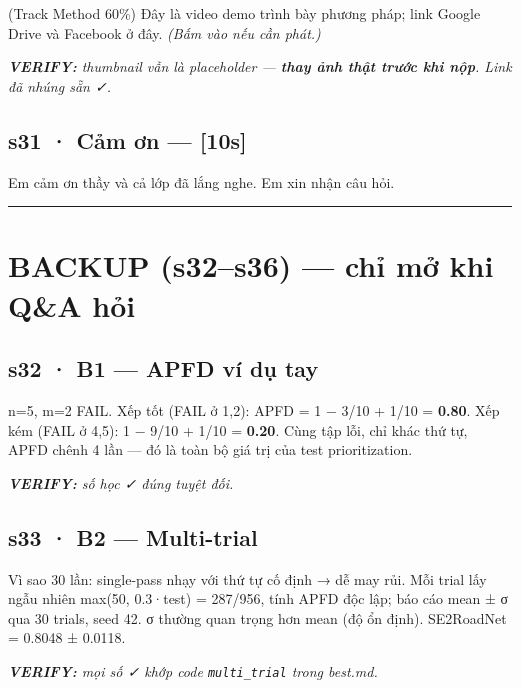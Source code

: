 \documentclass[
  11pt,
]{article}
\renewenvironment{quote}
  {\par\smallskip\noindent
   \def\FrameCommand{{\color{deckorange}\vrule width 2.5pt}\hspace{10pt}}%
   \MakeFramed{\advance\hsize-\width\FrameRestore}%
   \footnotesize\itshape\color{deckslate}}
  {\par\endMakeFramed\smallskip}
\begin{document}
(Track Method 60\%) Đây là video demo trình bày phương pháp; link Google
Drive và Facebook ở đây. \emph{(Bấm vào nếu cần phát.)}

\begin{quote}
\textbf{VERIFY:} thumbnail vẫn là placeholder --- \textbf{thay ảnh thật
trước khi nộp}. Link đã nhúng sẵn ✓.
\end{quote}

\subsection{s31 · Cảm ơn --- {[}10s{]}}\label{s31-cux1ea3m-ux1a1n-10s}

Em cảm ơn thầy và cả lớp đã lắng nghe. Em xin nhận câu hỏi.

\begin{center}\rule{0.5\linewidth}{0.5pt}\end{center}

\section{BACKUP (s32--s36) --- chỉ mở khi Q\&A
hỏi}\label{backup-s32s36-chux1ec9-mux1edf-khi-qa-hux1ecfi}

\subsection{s32 · B1 --- APFD ví dụ
tay}\label{s32-b1-apfd-vuxed-dux1ee5-tay}

n=5, m=2 FAIL. Xếp tốt (FAIL ở 1,2): APFD = 1 − 3/10 + 1/10 =
\textbf{0.80}. Xếp kém (FAIL ở 4,5): 1 − 9/10 + 1/10 = \textbf{0.20}.
Cùng tập lỗi, chỉ khác thứ tự, APFD chênh 4 lần --- đó là toàn bộ giá
trị của test prioritization.

\begin{quote}
\textbf{VERIFY:} số học ✓ đúng tuyệt đối.
\end{quote}

\subsection{s33 · B2 --- Multi-trial}\label{s33-b2-multi-trial}

Vì sao 30 lần: single-pass nhạy với thứ tự cố định → dễ may rủi. Mỗi
trial lấy ngẫu nhiên max(50, 0.3·\textbar test\textbar) = 287/956, tính
APFD độc lập; báo cáo mean ± σ qua 30 trials, seed 42. σ thường quan
trọng hơn mean (độ ổn định). SE2RoadNet = 0.8048 ± 0.0118.

\begin{quote}
\textbf{VERIFY:} mọi số ✓ khớp code \texttt{multi\_trial} trong best.md.
\end{quote}
\end{document}
